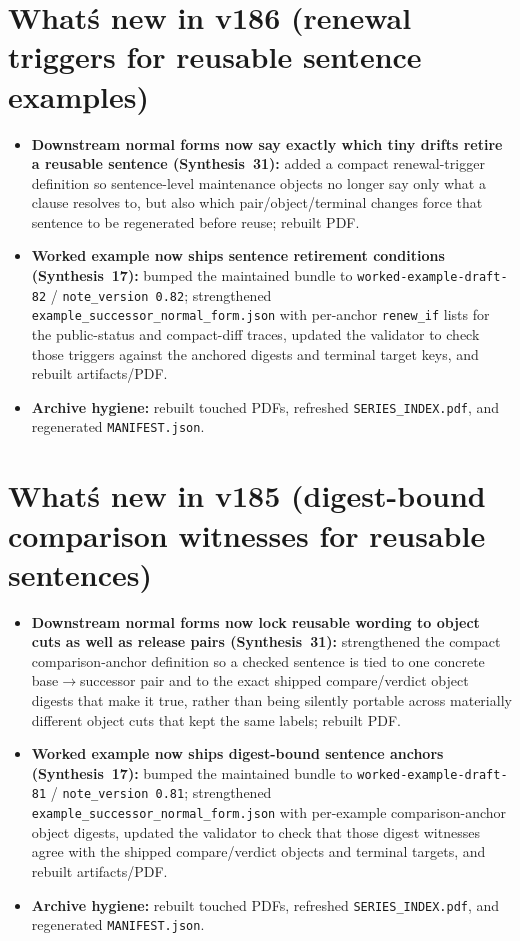 \documentclass[11pt]{article}
\begin{document}
\section{What\'s new in v186 (renewal triggers for reusable sentence examples)}
\begin{itemize}[leftmargin=*]
\item \textbf{Downstream normal forms now say exactly which tiny drifts retire a reusable sentence (Synthesis~31):} added a compact renewal-trigger definition so sentence-level maintenance objects no longer say only what a clause resolves to, but also which pair/object/terminal changes force that sentence to be regenerated before reuse; rebuilt PDF.
\item \textbf{Worked example now ships sentence retirement conditions (Synthesis~17):} bumped the maintained bundle to \texttt{worked-example-draft-82} / \texttt{note\_version 0.82}; strengthened \texttt{example\_successor\_normal\_form.json} with per-anchor \texttt{renew\_if} lists for the public-status and compact-diff traces, updated the validator to check those triggers against the anchored digests and terminal target keys, and rebuilt artifacts/PDF.
\item \textbf{Archive hygiene:} rebuilt touched PDFs, refreshed \texttt{SERIES\_INDEX.pdf}, and regenerated \texttt{MANIFEST.json}.
\end{itemize}

\section{What\'s new in v185 (digest-bound comparison witnesses for reusable sentences)}
\begin{itemize}[leftmargin=*]
\item \textbf{Downstream normal forms now lock reusable wording to object cuts as well as release pairs (Synthesis~31):} strengthened the compact comparison-anchor definition so a checked sentence is tied to one concrete base$\to$successor pair and to the exact shipped compare/verdict object digests that make it true, rather than being silently portable across materially different object cuts that kept the same labels; rebuilt PDF.
\item \textbf{Worked example now ships digest-bound sentence anchors (Synthesis~17):} bumped the maintained bundle to \texttt{worked-example-draft-81} / \texttt{note\_version 0.81}; strengthened \texttt{example\_successor\_normal\_form.json} with per-example comparison-anchor object digests, updated the validator to check that those digest witnesses agree with the shipped compare/verdict objects and terminal targets, and rebuilt artifacts/PDF.
\item \textbf{Archive hygiene:} rebuilt touched PDFs, refreshed \texttt{SERIES\_INDEX.pdf}, and regenerated \texttt{MANIFEST.json}.
\end{itemize}
\end{document}

